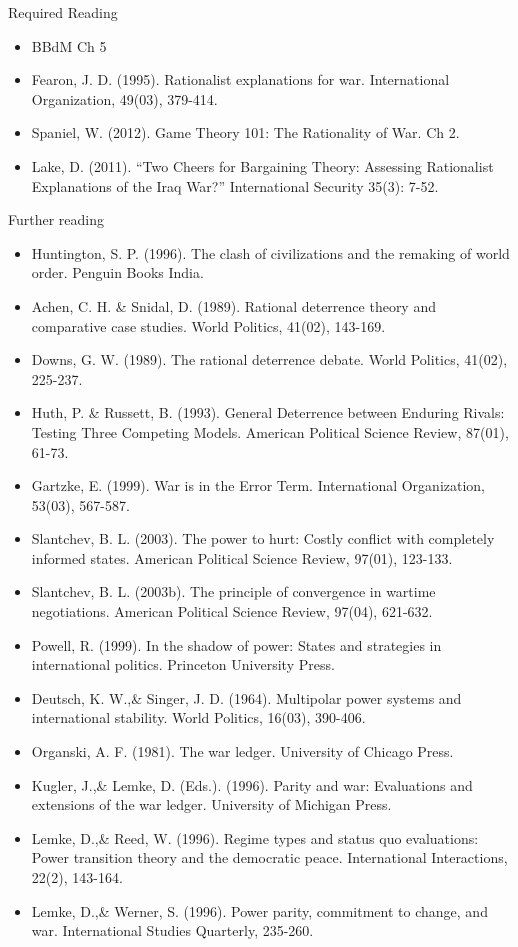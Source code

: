 \documentclass[12pt,a4paper]{article}
\begin{document}
\noindent Required Reading

\begin{itemize}
	\item BBdM Ch 5
	\item Fearon, J. D. (1995). Rationalist explanations for war. International Organization, 49(03), 379-414.
	\item Spaniel, W. (2012). Game Theory 101: The Rationality of War. Ch 2.
	\item Lake, D. (2011). “Two Cheers for Bargaining Theory: Assessing Rationalist Explanations of the Iraq War?” International Security 35(3): 7-52.
\end{itemize}

\noindent Further reading

\begin{itemize}
	\item Huntington, S. P. (1996). The clash of civilizations and the remaking of world order. Penguin Books India.
	\item Achen, C. H. \& Snidal, D. (1989). Rational deterrence theory and comparative case studies. World Politics, 41(02), 143-169.
	\item Downs, G. W. (1989). The rational deterrence debate. World Politics, 41(02), 225-237.
	\item Huth, P. \& Russett, B. (1993). General Deterrence between Enduring Rivals: Testing Three Competing Models. American Political Science Review, 87(01), 61-73.
	\item Gartzke, E. (1999). War is in the Error Term. International Organization, 53(03), 567-587.
	\item Slantchev, B. L. (2003). The power to hurt: Costly conflict with completely informed states. American Political Science Review, 97(01), 123-133.
	\item Slantchev, B. L. (2003b). The principle of convergence in wartime negotiations. American Political Science Review, 97(04), 621-632.
	\item Powell, R. (1999). In the shadow of power: States and strategies in international politics. Princeton University Press.
	\item Deutsch, K. W.,\& Singer, J. D. (1964). Multipolar power systems and international stability. World Politics, 16(03), 390-406.
	\item Organski, A. F. (1981). The war ledger. University of Chicago Press.
	\item Kugler, J.,\& Lemke, D. (Eds.). (1996). Parity and war: Evaluations and extensions of the war ledger. University of Michigan Press.
	\item Lemke, D.,\& Reed, W. (1996). Regime types and status quo evaluations: Power transition theory and the democratic peace. International Interactions, 22(2), 143-164.
	\item Lemke, D.,\& Werner, S. (1996). Power parity, commitment to change, and war. International Studies Quarterly, 235-260.
\end{itemize}
\end{document}
